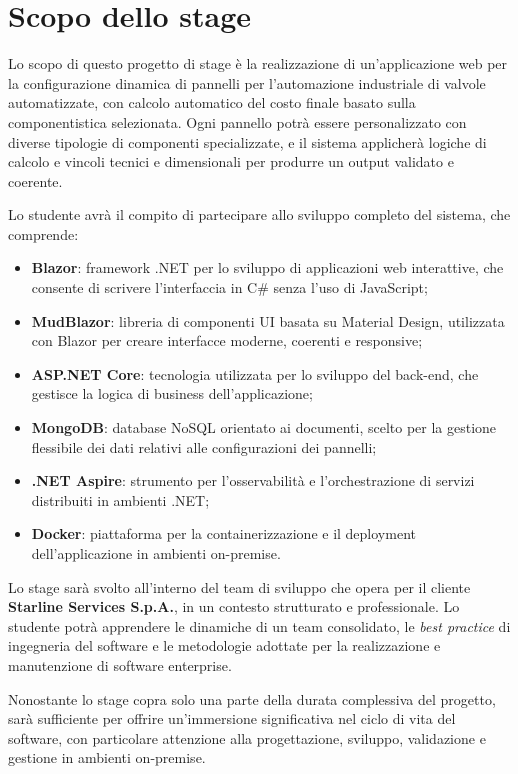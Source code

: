 \section*{Scopo dello stage}

Lo scopo di questo progetto di stage è la realizzazione di un'applicazione web per la configurazione dinamica di pannelli per l'automazione industriale di valvole automatizzate, con calcolo automatico del costo finale basato sulla componentistica selezionata. Ogni pannello potrà essere personalizzato con diverse tipologie di componenti specializzate, e il sistema applicherà logiche di calcolo e vincoli tecnici e dimensionali per produrre un output validato e coerente.

Lo studente avrà il compito di partecipare allo sviluppo completo del sistema, che comprende:

\begin{itemize}
    \item \textbf{Blazor}: framework .NET per lo sviluppo di applicazioni web interattive, che consente di scrivere l’interfaccia in C\# senza l’uso di JavaScript;
    \item \textbf{MudBlazor}: libreria di componenti UI basata su Material Design, utilizzata con Blazor per creare interfacce moderne, coerenti e responsive;
    \item \textbf{ASP.NET Core}: tecnologia utilizzata per lo sviluppo del back-end, che gestisce la logica di business dell’applicazione;
    \item \textbf{MongoDB}: database NoSQL orientato ai documenti, scelto per la gestione flessibile dei dati relativi alle configurazioni dei pannelli;
    \item \textbf{.NET Aspire}: strumento per l’osservabilità e l’orchestrazione di servizi distribuiti in ambienti .NET;
    \item \textbf{Docker}: piattaforma per la containerizzazione e il deployment dell’applicazione in ambienti on-premise.
\end{itemize}

Lo stage sarà svolto all’interno del team di sviluppo che opera per il cliente \textbf{Starline Services S.p.A.}, in un contesto strutturato e professionale. Lo studente potrà apprendere le dinamiche di un team consolidato, le \textit{best practice} di ingegneria del software e le metodologie adottate per la realizzazione e manutenzione di software enterprise.

Nonostante lo stage copra solo una parte della durata complessiva del progetto, sarà sufficiente per offrire un’immersione significativa nel ciclo di vita del software, con particolare attenzione alla progettazione, sviluppo, validazione e gestione in ambienti on-premise.
